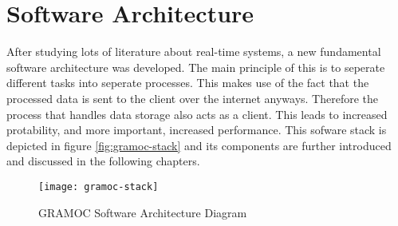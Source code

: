 \chapter{Software Architecture}
\label{ch:Software_Architecture}

\author{Nico Kratky}
%

After studying lots of literature about real-time systems, a new fundamental software architecture was developed. The main principle of this is to seperate different tasks into seperate processes. This makes use of the fact that the processed data is sent to the client over the internet anyways. Therefore the process that handles data storage also acts as a client. This leads to increased protability, and more important, increased performance. This sofware stack is depicted in figure \vref{fig:gramoc-stack} and its components are further introduced and discussed in the following chapters.

\begin{figure}[!htb]
    \centering
    \texttt{[image: gramoc-stack]}
    \caption{GRAMOC Software Architecture Diagram}
    \label{fig:gramoc-stack}
\end{figure}

